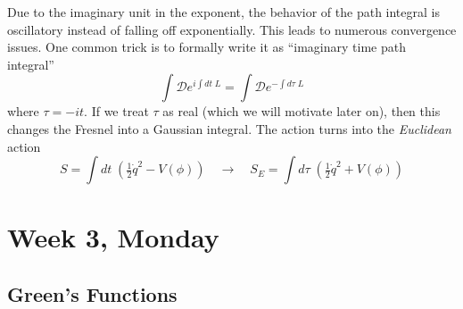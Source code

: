 \documentclass[12pt]{article}
\begin{document}
Due to the imaginary unit in the exponent, the behavior of the path
integral is oscillatory instead of falling off exponentially. This
leads to numerous convergence issues. One common trick is to formally
write it as ``imaginary time path integral''
\begin{equation}
  \int \mathcal{D} e^{i\int dt\; L} = 
  \int \mathcal{D} e^{-\int d\tau\; L}
\end{equation}
where $\tau = -i t$. If we treat $\tau$ as real (which we will
motivate later on), then this changes the Fresnel into a Gaussian
integral. The action turns into the \emph{Euclidean} action
\begin{equation}
  S = \int dt \; 
  \left( \tfrac{1}{2} \dot{q}^2 - V(\phi) \right) 
  \quad \longrightarrow \quad 
  S_E = \int d\tau \; 
  \left( \tfrac{1}{2} \dot{q}^2 + V(\phi) \right)
\end{equation}




\section{Week 3, Monday}

\subsection{Green's Functions}
\end{document}
